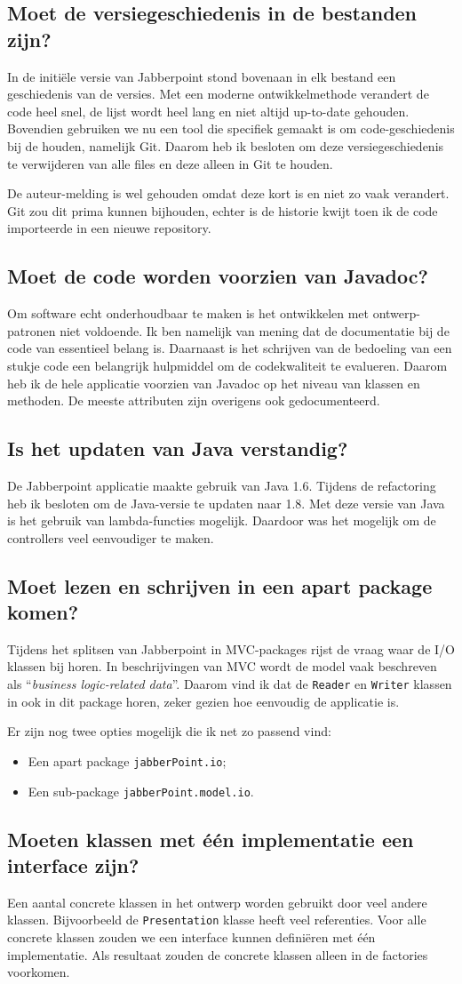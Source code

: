 \documentclass[a4paper]{article}
\newcommand{\question}[1]{
  \subsection{#1}
}
\newcommand{\code}[1]{\lstinline[columns=fixed]{#1}}
\begin{document}
    \question{Moet de versiegeschiedenis in de bestanden zijn?}
		In de initiële versie van Jabberpoint stond bovenaan in elk bestand een geschiedenis van de versies.
		Met een moderne ontwikkelmethode verandert de code heel snel, de lijst wordt heel lang en niet altijd up-to-date gehouden.
		Bovendien gebruiken we nu een tool die specifiek gemaakt is om code-geschiedenis bij de houden, namelijk Git.
		Daarom heb ik besloten om deze versiegeschiedenis te verwijderen van alle files en deze alleen in Git te houden.

		De auteur-melding is wel gehouden omdat deze kort is en niet zo vaak verandert.
		Git zou dit prima kunnen bijhouden, echter is de historie kwijt toen ik de code importeerde in een nieuwe repository.

    \question{Moet de code worden voorzien van Javadoc?}
		Om software echt onderhoudbaar te maken is het ontwikkelen met ontwerp-patronen niet voldoende.
		Ik ben namelijk van mening dat de documentatie bij de code van essentieel belang is.
		Daarnaast is het schrijven van de bedoeling van een stukje code een belangrijk hulpmiddel om de codekwaliteit te evalueren.
		Daarom heb ik de hele applicatie voorzien van Javadoc op het niveau van klassen en methoden.
		De meeste attributen zijn overigens ook gedocumenteerd.

	\question{Is het updaten van Java verstandig?}
		De Jabberpoint applicatie maakte gebruik van Java 1.6.
		Tijdens de refactoring heb ik besloten om de Java-versie te updaten naar 1.8.
		Met deze versie van Java is het gebruik van lambda-functies mogelijk.
		Daardoor was het mogelijk om de controllers veel eenvoudiger te maken.

	\question{Moet lezen en schrijven in een apart package komen?}
		Tijdens het splitsen van Jabberpoint in MVC-packages rijst de vraag waar de I/O klassen bij horen.
		In beschrijvingen van MVC wordt de model vaak beschreven als ``\textit{business logic-related data}''.
		Daarom vind ik dat de \code{Reader} en \code{Writer} klassen in ook in dit package horen, zeker gezien hoe eenvoudig de applicatie is.

		Er zijn nog twee opties mogelijk die ik net zo passend vind:
		\begin{itemize}
			\item Een apart package \code{jabberPoint.io};
			\item Een sub-package \code{jabberPoint.model.io}.
		\end{itemize}

	\question{Moeten klassen met één implementatie een interface zijn?}\label{q:interfaces}
		Een aantal concrete klassen in het ontwerp worden gebruikt door veel andere klassen.
		Bijvoorbeeld de \code{Presentation} klasse heeft veel referenties.
		Voor alle concrete klassen zouden we een interface kunnen definiëren met één implementatie.
		Als resultaat zouden de concrete klassen alleen in de factories voorkomen.
\end{document}
